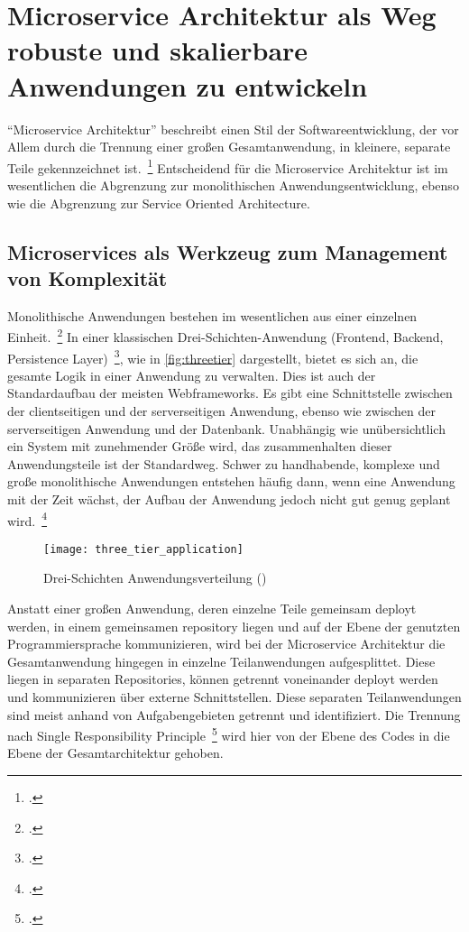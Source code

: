 \chapter{Microservice Architektur als Weg robuste und skalierbare Anwendungen zu entwickeln}
``Microservice Architektur'' beschreibt einen Stil der Softwareentwicklung, der vor Allem durch die Trennung einer großen Gesamtanwendung, in kleinere, separate Teile gekennzeichnet ist.~\footcite[vgl.][Seite 2]{newman2015building}
Entscheidend für die Microservice Architektur ist im wesentlichen die Abgrenzung zur monolithischen Anwendungsentwicklung, ebenso wie die Abgrenzung zur Service Oriented Architecture.

\section{Microservices als Werkzeug zum Management von Komplexität}
Monolithische Anwendungen bestehen im wesentlichen aus einer einzelnen Einheit.~\footcite[vgl.][]{Fowler:Intro} In einer klassischen Drei-Schichten-Anwendung (Frontend, Backend, Persistence Layer)~\footcite[vgl.][]{MSDN:TTA}, wie in \autoref{fig:threetier} dargestellt, bietet es sich an, die gesamte Logik in einer Anwendung zu verwalten. Dies ist auch der Standardaufbau der meisten Webframeworks. Es gibt eine Schnittstelle zwischen der clientseitigen und der serverseitigen Anwendung, ebenso wie zwischen der serverseitigen Anwendung und der Datenbank. Unabhängig wie unübersichtlich ein System mit zunehmender Größe wird, das zusammenhalten dieser Anwendungsteile ist der Standardweg. Schwer zu handhabende, komplexe und große monolithische Anwendungen entstehen häufig dann, wenn eine Anwendung mit der Zeit wächst, der Aufbau der Anwendung jedoch nicht gut genug geplant wird.~\footcite[vgl.][]{infaktuell}
\begin{figure}[!ht]
    \caption{Drei-Schichten Anwendungsverteilung (\cite{ThreeTieredDistribution})}
    \label{fig:threetier}
    \texttt{[image: three\_tier\_application]}
\end{figure}

Anstatt einer großen Anwendung, deren einzelne Teile gemeinsam deployt werden, in einem gemeinsamen repository liegen und auf der Ebene der genutzten Programmiersprache kommunizieren, wird bei der Microservice Architektur die Gesamtanwendung hingegen in einzelne Teilanwendungen aufgesplittet. Diese liegen in separaten Repositories, können getrennt voneinander deployt werden und kommunizieren über externe Schnittstellen. Diese separaten Teilanwendungen sind meist anhand von Aufgabengebieten getrennt und identifiziert. Die Trennung nach Single Responsibility Principle~\footcite[vgl.][Seite 108]{Martin:SRP} wird hier von der Ebene des Codes in die Ebene der Gesamtarchitektur gehoben.

